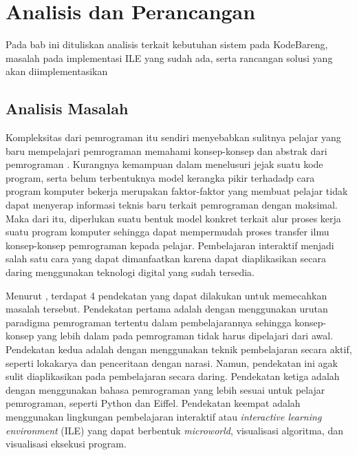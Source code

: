 \chapter{Analisis dan Perancangan}
Pada bab ini dituliskan analisis terkait kebutuhan sistem pada KodeBareng, masalah pada implementasi ILE yang sudah ada, serta rancangan solusi yang akan diimplementasikan

\section{Analisis Masalah}


Kompleksitas dari pemrograman itu sendiri menyebabkan sulitnya pelajar yang baru mempelajari pemrograman memahami konsep-konsep dan abstrak dari pemrograman \parencite{moons2013pilot}. Kurangnya kemampuan dalam menelusuri jejak suatu kode program, serta belum terbentuknya model kerangka pikir terhadadp cara program komputer bekerja \parencite{mayer1981psychology} merupakan faktor-faktor yang membuat pelajar tidak dapat menyerap informasi teknis baru terkait pemrograman dengan maksimal. Maka dari itu, diperlukan suatu bentuk model konkret terkait alur proses kerja suatu program komputer sehingga dapat mempermudah proses transfer ilmu konsep-konsep pemrograman kepada pelajar. Pembelajaran interaktif menjadi salah satu cara yang dapat dimanfaatkan karena dapat diaplikasikan secara daring menggunakan teknologi digital yang sudah tersedia.

Menurut \textcite{moons2013pilot}, terdapat 4 pendekatan yang dapat dilakukan untuk memecahkan masalah tersebut. Pendekatan pertama adalah dengan menggunakan urutan paradigma pemrograman tertentu dalam pembelajarannya sehingga konsep-konsep yang lebih dalam pada pemrograman tidak harus dipelajari dari awal. Pendekatan kedua adalah dengan menggunakan teknik pembelajaran secara aktif, seperti lokakarya dan penceritaan dengan narasi. Namun, pendekatan ini agak sulit diaplikasikan pada pembelajaran secara daring. Pendekatan ketiga adalah dengan menggunakan bahasa pemrograman yang lebih sesuai untuk pelajar pemrograman, seperti Python dan Eiffel. Pendekatan keempat adalah menggunakan lingkungan pembelajaran interaktif atau \textit{interactive learning environment} (ILE) yang dapat berbentuk \textit{microworld}, visualisasi algoritma, dan visualisasi eksekusi program.

